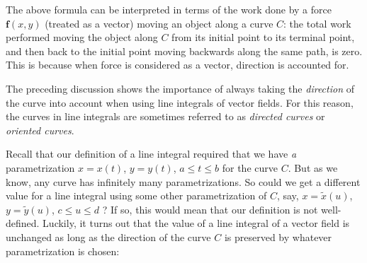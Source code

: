 The above formula can be interpreted in terms of the work done by a force $\mathbf{f}(x,y)$ (treated as a vector) moving
an object along a curve $C$: the total work performed moving the object along $C$ from its initial point to its terminal
point, and then back to the initial point moving backwards along the same path, is zero. This is because when force is
considered as a vector, direction is accounted for.

The preceding discussion shows the importance of always taking the \emph{direction} of the curve into account when
using line integrals of vector fields. For this reason, the curves in line integrals are sometimes referred to as
\emph{directed curves} or \emph{oriented curves}.

Recall that our definition of a line integral required that we have
\emph{a} parametrization $x=x(t)$, $y=y(t)$, $a \le t \le b$ for the curve $C$. But as we know, any curve has
infinitely many parametrizations. So could we get a different value for a
line integral using some other parametrization of $C$, say, $x=\tilde{x}(u)$, $y=\tilde{y}(u)$, $c \le u \le d$ ? If so,
this would mean that our definition is not well-defined. Luckily, it turns out that the value of a line
integral of a vector field is unchanged as long as the direction of the curve $C$ is preserved by whatever
parametrization is chosen:


